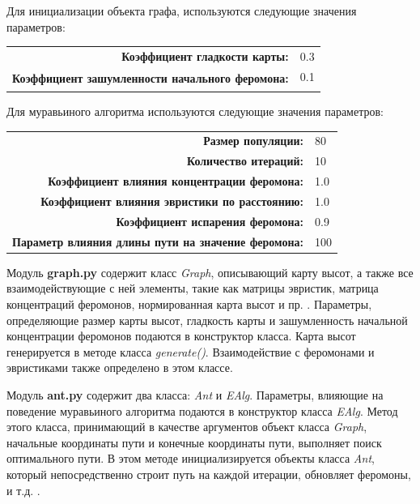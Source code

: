 \documentclass{article}
\numberwithin{equation}{section}
\begin{document}
		Для инициализации объекта графа, используются следующие значения параметров:\\

		\begin{tabular}{rl}
			\textbf{Коэффициент гладкости карты:} & 0.3\\
			\multirow{2}{*}{\parbox{7cm}{\textbf{Коэффициент зашумленности начального феромона:}}} & 0.1\\
			&
		\end{tabular}

		Для муравьиного алгоритма используются следующие значения параметров:\\

		\begin{tabular}{rl}
			\textbf{Размер популяции:} & 80\\
			\textbf{Количество итераций:} & 10\\
			\multirow{2}{*}{\parbox{5.5cm}{\textbf{Коэффициент влияния концентрации феромона:}}} & \multirow{2}{*}{1.0}\\
			&\\
			\multirow{2}{*}{\parbox{5.6cm}{\textbf{Коэффициент влияния эвристики по расстоянию:}}} & \multirow{2}{*}{1.0}\\
			&\\
			\multirow{2}{*}{\parbox{4.2cm}{\textbf{Коэффициент испарения феромона:}}} & \multirow{2}{*}{0.9}\\
			&\\
			\multirow{2}{*}{\parbox{6cm}{\textbf{Параметр влияния длины пути на значение феромона:}}} & \multirow{2}{*}{100}\\
			&
		\end{tabular}

		Модуль \textbf{graph.py} содержит класс \textit{Graph}, описывающий карту высот, а также все взаимодействующие с ней элементы, такие как матрицы эвристик, матрица концентраций феромонов, нормированная карта высот и пр. . Параметры, определяющие размер карты высот, гладкость карты и зашумленность начальной концентрации феромонов подаются в конструктор класса. Карта высот генерируется в методе класса \textit{generate()}. Взаимодействие с феромонами и эвристиками также определено в этом классе.

		Модуль \textbf{ant.py} содержит два класса: \textit{Ant} и \textit{EAlg}. Параметры, влияющие на поведение муравьиного алгоритма подаются в конструктор класса \textit{EAlg}. Метод этого класса, принимающий в качестве аргументов объект класса \textit{Graph}, начальные координаты пути и конечные координаты пути, выполняет поиск оптимального пути. В этом методе инициализируется объекты класса \textit{Ant}, который непосредственно строит путь на каждой итерации, обновляет феромоны, и т.д. .
\end{document}
